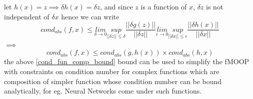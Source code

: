 let $h(x) = z \implies \delta h(x) = \delta z $, and since $z$ is a function of $x$, $\delta z$ is not independent of $\delta x$ hence we can write
\begin{equation}
    cond_{abs}(f,x) \le \underset{\delta \to 0}{lim}\underset{||\delta z||\le \delta}{sup} \frac{||\delta g(z)||}{||\delta z||} \underset{\epsilon \to 0}{lim}\underset{||\delta x||\le \epsilon}{sup} \frac{||\delta h(x)||}{||\delta x||}
\end{equation}
$\implies$
\begin{equation} \label{cond_fun_comp_bound}
    cond_{abs}(f,x) \le cond_{abs}(g,h(x))\times cond_{abs}(h,x)
\end{equation}
the above \ref{cond_fun_comp_bound} bound can be used to simplify the fMOOP with constraints on condition number for complex functions which are composition of simpler function whose condition number can be bound analytically, for eg. Neural Networks come under such functions.

